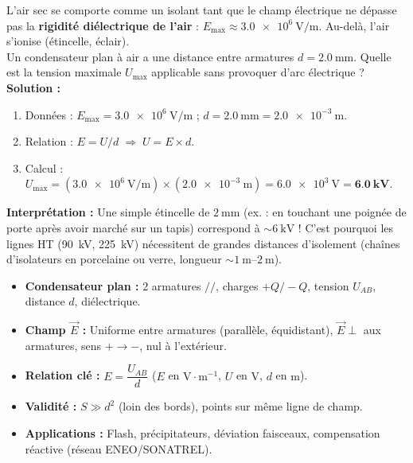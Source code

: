 \documentclass[11pt]{article}
\begin{document}
\begin{exoresolu}
L'air sec se comporte comme un isolant tant que le champ électrique ne dépasse pas la \textbf{rigidité diélectrique de l'air} : $E_{\text{max}} \approx \SI{3,0e6}{\V\per\m}$. Au-delà, l'air s'ionise (étincelle, éclair).\\
Un condensateur plan à air a une distance entre armatures $d = \SI{2,0}{\mm}$. Quelle est la tension maximale $U_{\text{max}}$ applicable sans provoquer d'arc électrique ?
\tcblower
\textbf{Solution :}
\begin{enumerate}
    \item Données : $E_{\text{max}} = \SI{3,0e6}{\V\per\m}$ ; $d = \SI{2,0}{\mm} = \SI{2,0e-3}{\m}$.
    \item Relation : $E = U/d \;\Rightarrow\; U = E \times d$.
    \item Calcul : $U_{\text{max}} = (\SI{3,0e6}{\V\per\m}) \times (\SI{2,0e-3}{\m}) = \SI{6,0e3}{\V} = \mathbf{\SI{6,0}{\kV}}$.
\end{enumerate}
\par \textbf{Interprétation :} Une simple étincelle de $\SI{2}{\mm}$ (ex. : en touchant une poignée de porte après avoir marché sur un tapis) correspond à $\sim \SI{6}{\kV}$ ! C'est pourquoi les lignes HT (\SI{90}{\kV}, \SI{225}{\kV}) nécessitent de grandes distances d'isolement (chaînes d'isolateurs en porcelaine ou verre, longueur $\sim \SI{1}{\m}\text{--}\SI{2}{\m}$).
\end{exoresolu}

\begin{aretenir}
\begin{itemize}
    \item \textbf{Condensateur plan :} 2 armatures $//$, charges $+Q/-Q$, tension $U_{AB}$, distance $d$, diélectrique.
    \item \textbf{Champ $\vec{E}$ :} Uniforme entre armatures (parallèle, équidistant), $\vec{E} \perp$ aux armatures, sens $+\to -$, nul à l'extérieur.
    \item \textbf{Relation clé :} $E = \dfrac{U_{AB}}{d}$ \quad ($E$ en $\text{V}\cdot\text{m}^{-1}$, $U$ en $\text{V}$, $d$ en $\text{m}$).
    \item \textbf{Validité :} $S \gg d^2$ (loin des bords), points sur même ligne de champ.
    \item \textbf{Applications :} Flash, précipitateurs, déviation faisceaux, compensation réactive (réseau ENEO/SONATREL).
\end{itemize}
\end{aretenir}
\end{document}
